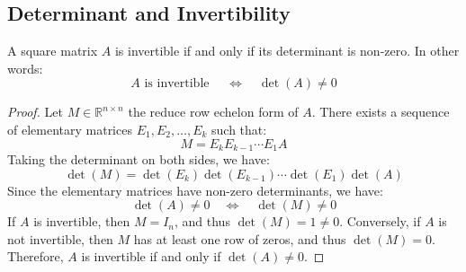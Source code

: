 \subsection{Determinant and Invertibility}
\begin{theorem}
    A square matrix \(A\) is invertible if and only if its determinant is non-zero. In other words:
    \[
        A \text{ is invertible } \quad \iff \quad \det(A) \neq 0
    \]
\end{theorem}
\begin{proof}
    Let $M \in \mathbb{R}^{n \times n}$ the reduce row echelon form of $A$. There exists a sequence of elementary matrices \(E_1, E_2, \ldots, E_k\) such that:
    \[
        M = E_k E_{k-1} \cdots E_1 A
    \]
    Taking the determinant on both sides, we have:
    \[
        \det(M) = \det(E_k) \det(E_{k-1}) \cdots \det(E_1) \det(A)
    \]
    Since the elementary matrices have non-zero determinants, we have:
    \[
        \det(A) \neq 0 \quad \iff \quad \det(M) \neq 0
    \]
    If $A$ is invertible, then $M = I_n$, and thus \(\det(M) = 1 \neq 0\). Conversely, if \(A\) is not invertible, then \(M\) has at least one row of zeros, and thus \(\det(M) = 0\). Therefore, \(A\) is invertible if and only if \(\det(A) \neq 0\).
\end{proof}

